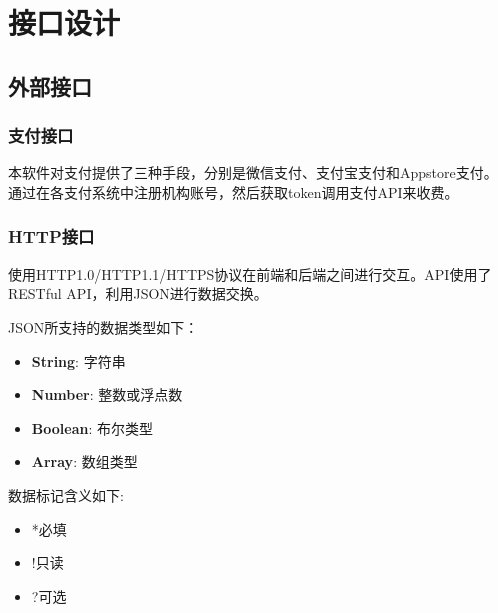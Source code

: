 \chapter{接口设计}
\section{外部接口}

\subsection{支付接口}

本软件对支付提供了三种手段，分别是微信支付、支付宝支付和Appstore支付。
通过在各支付系统中注册机构账号，然后获取token调用支付API来收费。

\subsection{HTTP接口}
使用HTTP1.0/HTTP1.1/HTTPS协议在前端和后端之间进行交互。API使用了RESTful API，利用JSON进行数据交换。

\noindent JSON所支持的数据类型如下：
\begin{itemize}
	\item \textbf{String}: 字符串
	\item \textbf{Number}: 整数或浮点数
	\item \textbf{Boolean}: 布尔类型
	\item \textbf{Array}: 数组类型
\end{itemize}

数据标记含义如下:
\begin{itemize}
	\item *必填
	\item !只读
	\item ?可选
\end{itemize}

